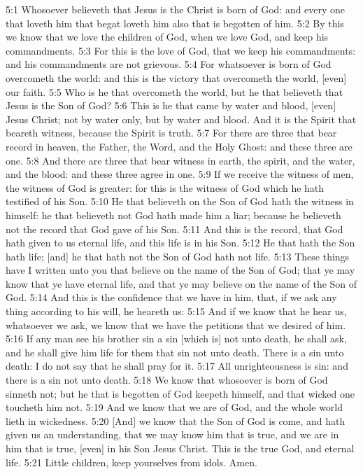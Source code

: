    {5:1} Whosoever believeth that Jesus is the Christ is born of God:
and every one that loveth him that begat loveth him also that is
begotten of him. {5:2} By this we know that we love the children of
God, when we love God, and keep his commandments. {5:3} For this is the
love of God, that we keep his commandments: and his commandments are
not grievous. {5:4} For whatsoever is born of God overcometh the world:
and this is the victory that overcometh the world, [even] our faith.
{5:5} Who is he that overcometh the world, but he that believeth that
Jesus is the Son of God? {5:6} This is he that came by water and blood,
[even] Jesus Christ; not by water only, but by water and blood. And it
is the Spirit that beareth witness, because the Spirit is truth. {5:7}
For there are three that bear record in heaven, the Father, the Word,
and the Holy Ghost: and these three are one. {5:8} And there are three
that bear witness in earth, the spirit, and the water, and the blood:
and these three agree in one. {5:9} If we receive the witness of men,
the witness of God is greater: for this is the witness of God which he
hath testified of his Son. {5:10} He that believeth on the Son of God
hath the witness in himself: he that believeth not God hath made him a
liar; because he believeth not the record that God gave of his Son.
{5:11} And this is the record, that God hath given to us eternal life,
and this life is in his Son. {5:12} He that hath the Son hath life;
[and] he that hath not the Son of God hath not life. {5:13} These
things have I written unto you that believe on the name of the Son of
God; that ye may know that ye have eternal life, and that ye may
believe on the name of the Son of God. {5:14} And this is the
confidence that we have in him, that, if we ask any thing according to
his will, he heareth us: {5:15} And if we know that he hear us,
whatsoever we ask, we know that we have the petitions that we desired
of him. {5:16} If any man see his brother sin a sin [which is] not unto
death, he shall ask, and he shall give him life for them that sin not
unto death. There is a sin unto death: I do not say that he shall pray
for it. {5:17} All unrighteousness is sin: and there is a sin not unto
death. {5:18} We know that whosoever is born of God sinneth not; but he
that is begotten of God keepeth himself, and that wicked one toucheth
him not. {5:19} And we know that we are of God, and the whole world
lieth in wickedness. {5:20} [And] we know that the Son of God is come,
and hath given us an understanding, that we may know him that is true,
and we are in him that is true, [even] in his Son Jesus Christ. This is
the true God, and eternal life. {5:21} Little children, keep yourselves
from idols. Amen.






\clearpage
